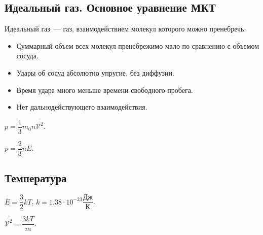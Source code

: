 \documentclass[12pt]{article}
\begin{document}
	\subsection{Идеальный газ. Основное уравнение МКТ}
	\begin{definition}
		Идеальный газ~--- газ, взаимодействием молекул которого можно пренебречь.
		\begin{itemize}
			\item Суммарный объем всех молекул пренебрежимо мало по сравнению с объемом сосуда.
			\item Удары об сосуд абсолютно упругие, без диффузии.
			\item Время удара много меньше времени свободного пробега.
			\item Нет дальнодействующего взаимодействия.
		\end{itemize}
	\end{definition}
	\begin{definition}
		$p = \dfrac{1}{3} m_0 n \overline{\mathcal{V}^2}$.
	\end{definition}
	\begin{corollary}
		$p = \dfrac{2}{3} n \overline{E}$.
	\end{corollary}
	\subsection{Температура}
	\begin{definition}
		$\overline{E} = \dfrac{3}{2}kT$, $k = 1.38 \cdot 10^{-23} \dfrac{\text{Дж}}{\text{К}}$.
	\end{definition}
	\begin{definition}
		$\overline{\mathcal{V}^2} = \dfrac{3kT}{m}$.
	\end{definition}
\end{document}
